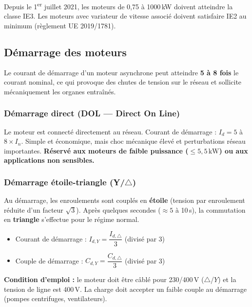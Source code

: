 \begin{attention}
  Depuis le 1\textsuperscript{er} juillet 2021, les moteurs de 0,75 à 1000\,kW doivent atteindre la classe IE3. Les moteurs avec variateur de vitesse associé doivent satisfaire IE2 au minimum (règlement UE 2019/1781).
\end{attention}

\subsection{Démarrage des moteurs}

Le courant de démarrage d'un moteur asynchrone peut atteindre \textbf{5 à 8 fois} le courant nominal, ce qui provoque des chutes de tension sur le réseau et sollicite mécaniquement les organes entraînés.

\subsubsection{Démarrage direct (DOL — Direct On Line)}

\begin{definition}
  Le moteur est connecté directement au réseau. Courant de démarrage : $I_d = 5$ à $8 \times I_n$. Simple et économique, mais choc mécanique élevé et perturbations réseau importantes. \textbf{Réservé aux moteurs de faible puissance ($\leq 5{,}5\,\text{kW}$) ou aux applications non sensibles.}
\end{definition}

\subsubsection{Démarrage étoile-triangle (Y/$\triangle$)}

\begin{definition}
  Au démarrage, les enroulements sont couplés en \textbf{étoile} (tension par enroulement réduite d'un facteur $\sqrt{3}$). Après quelques secondes ($\approx 5$ à 10\,s), la commutation en \textbf{triangle} s'effectue pour le régime normal.

  \begin{itemize}
    \item Courant de démarrage : $I_{d,Y} = \dfrac{I_{d,\triangle}}{3}$ (divisé par 3)
    \item Couple de démarrage : $C_{d,Y} = \dfrac{C_{d,\triangle}}{3}$ (divisé par 3)
  \end{itemize}

  \textbf{Condition d'emploi :} le moteur doit être câblé pour 230/400\,V ($\triangle$/$Y$) et la tension de ligne est 400\,V. La charge doit accepter un faible couple au démarrage (pompes centrifuges, ventilateurs).
\end{definition}

